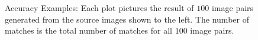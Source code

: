 \documentclass[12pt,journal,compsoc]{IEEEtran}
\begin{document}
\begin{figure}
	\label{fig:accuracy}
	\caption{Accuracy Examples: Each plot pictures the result of $100$ 
	image pairs generated from the source images shown to the left.  The 
number of matches is the total number of matches for all $100$ image 
pairs.}
\end{figure}
\end{document}
